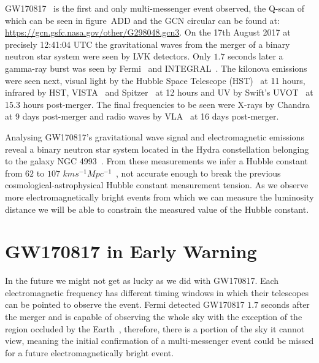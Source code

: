 GW170817~\cite{GW170817:2017} is the first and only multi-messenger event observed, the Q-scan of which can be seen in figure~ADD and the GCN circular can be found at: \href{https://gcn.gsfc.nasa.gov/other/G298048.gcn3}{https://gcn.gsfc.nasa.gov/other/G298048.gcn3}. On the 17th August 2017 at precisely 12:41:04 UTC the gravitational waves from the merger of a binary neutron star system were seen by LVK detectors. Only $1.7$ seconds later a gamma-ray burst was seen by Fermi~\cite{Fermi:2022, Fermi_GW170817:2017} and INTEGRAL~\cite{INTEGRAL:2003, INTEGRAL_GW170817:2017}. The kilonova emissions were seen next, visual light by the Hubble Space Telescope (HST)~\cite{HST:2000, HST_GW170817:2021} at 11 hours, infrared by HST, VISTA~\cite{VISTA:2015, VISTA_GW170817:2017} and Spitzer~\cite{Spitzer:2004, Spitzer_GW170817:2018} at 12 hours and UV by Swift's UVOT~\cite{Swift:2004, Swift_GW170817:2017} at 15.3 hours post-merger. The final frequencies to be seen were X-rays by Chandra~\cite{Chandra_GW170817:2017} at 9 days post-merger and radio waves by VLA~\cite{VLA:2019, VLA_GW170817:2017} at 16 days post-merger. 

Analysing GW170817's gravitational wave signal and electromagnetic emissions reveal a binary neutron star system located in the Hydra constellation belonging to the galaxy NGC 4993~\cite{NGC4993:1998}. From these measurements we infer a Hubble constant from $62$ to $107$ $km s^{-1} Mpc^{-1}$~\cite{GW170817_H0:2017}, not accurate enough to break the previous cosmological-astrophysical Hubble constant measurement tension. As we observe more electromagnetically bright events from which we can measure the luminosity distance we will be able to constrain the measured value of the Hubble constant.

\section{GW170817 in Early Warning}

In the future we might not get as lucky as we did with GW170817. Each electromagnetic frequency has different timing windows in which their telescopes can be pointed to observe the event. Fermi detected GW170817 $1.7$ seconds after the merger and is capable of observing the whole sky with the exception of the region occluded by the Earth~\cite{Fermi:2022}, therefore, there is a portion of the sky it cannot view, meaning the initial confirmation of a multi-messenger event could be missed for a future electromagnetically bright event.

